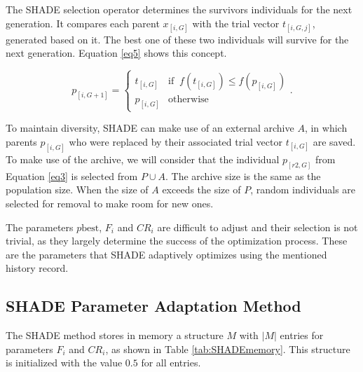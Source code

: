 The \acs{SHADE} selection operator determines the survivors individuals for the next generation. It compares each parent $x_{[i,G]}$ with the trial vector $t_{[i,G,j]}$, generated based on it. The best one of these two individuals will survive for the next generation. Equation \eqref{eq5} shows this concept.

\begin{equation}
p_{[i,G + 1]} = \left\{ \begin{array}{lc}
t_{[i,G]} &   \text{if} \;\; f(t_{[i,G]}) \le f(p_{[i,G]}) \\
p_{[i,G]} &  \text{otherwise}
\end{array}
\right..
\label{eq5}
\end{equation}

To maintain diversity, \acs{SHADE} can make use of an external archive $A$, in which parents $p_{[i,G]}$ who were replaced by their associated trial vector $t_{[i,G]}$ are saved. To make use of the archive, we will consider that the individual $p_{[r2,G]}$ from Equation \eqref{eq3} is selected from $P \cup A$. The archive size is the same as the population size. When the size of $A$ exceeds the size of $P$, random individuals are selected for removal to make room for new ones.

The parameters $p\text{best}$, $F_i$ and $CR_i$ are difficult to adjust and their selection is not trivial, as they largely determine the success of the optimization process. These are the parameters that \acs{SHADE} adaptively optimizes using the mentioned history record.

\subsection{SHADE Parameter Adaptation Method}

The \acs{SHADE} method stores in memory a structure $M$ with $|M|$ entries for parameters $F_i$ and $CR_i$, as shown in Table \ref{tab:SHADEmemory}. This structure is initialized with the value $0.5$ for all entries.

\begin{table}[!h]
	\centering
	\setlength{\tabcolsep}{13pt}
	\caption[Historical memory $M_{CR}$, $M_{F}$ used by SHADE.]{Historical memory $M_{CR}$, $M_{F}$ used by \acs{SHADE} \cite{tanabe2013success}.}
	\label{tab:SHADEmemory}
\end{table}

